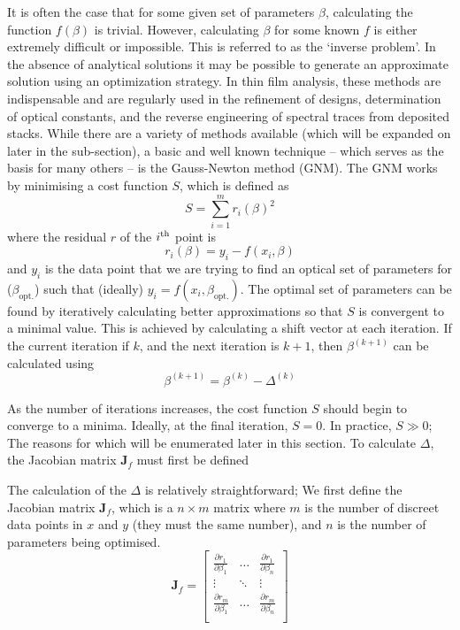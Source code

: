 \documentclass[10pt,a4paper,portrait]{report}
\begin{document}
It is often the case that for some given set of parameters $\beta$, calculating the function $f(\beta)$ is trivial. 
However, calculating $\beta$ for some known $f$ is either extremely difficult or impossible.
This is referred to as the `inverse problem'.
In the absence of analytical solutions it may be possible to generate an approximate solution using an optimization strategy.
In thin film analysis, these methods are indispensable and are regularly used in the refinement of designs, determination of optical constants, and the reverse engineering of spectral traces from deposited stacks. 
While there are a variety of methods available (which will be expanded on later in the sub-section), a basic and well known technique -- which serves as the basis for many others -- is the Gauss-Newton method (GNM). The GNM works by minimising a cost function $S$, which is defined as
\begin{equation}
\label{gauss-newton-cost-function}
S = \sum\limits_{i=1}^{m} r_i \left(\beta\right)^2
\end{equation}
where the residual $r$ of the $i^{\mathrm{th}}$ point is
\begin{equation}
r_i \left( \beta \right) = y_i - f\left(x_i, \beta \right)
\end{equation}
and $y_i$ is the data point that we are trying to find an optical set of parameters for ($\beta_{\mathrm{opt.}}$) such that (ideally) $y_i = f(x_i, \beta_{\mathrm{opt.}})$.
The optimal set of parameters can be found by iteratively calculating better approximations so that $S$ is convergent to a minimal value. This is achieved by calculating a shift vector at each iteration. If the current iteration if $k$, and the next iteration is $k+1$, then $\beta^{(k+1)}$ can be calculated using
\begin{equation}
\label{gauss-newton-new-beta}
\beta^{(k+1)} = \beta^{(k)} - \Delta^{(k)}
\end{equation}

\noindent
As the number of iterations increases, the cost function $S$ should begin to converge to a minima. Ideally, at the final iteration, $S=0$.
In practice, $S\gg0$;
The reasons for which will be enumerated later in this section.
To calculate $\Delta$, the Jacobian matrix $\mathbf{J}_f$ must first be defined

\noindent
The calculation of the $\Delta$ is relatively straightforward; We first define the Jacobian matrix $\mathbf{J}_f$, which is a $n\times m$ matrix where $m$ is the number of discreet data points in $x$ and $y$ (they must the same number), and $n$ is the number of parameters being optimised.
\begin{equation}
\mathbf{J}_f =
\begin{bmatrix}
\frac{\partial r_1}{\partial \beta_1} &
\ldots &
\frac{\partial r_1}{\partial \beta_n} \\
\vdots &
\ddots &
\vdots \\
\frac{\partial r_m}{\partial \beta_1} &
\ldots &
\frac{\partial r_m}{\partial \beta_n} \\
\end{bmatrix}
\end{equation}
\end{document}

